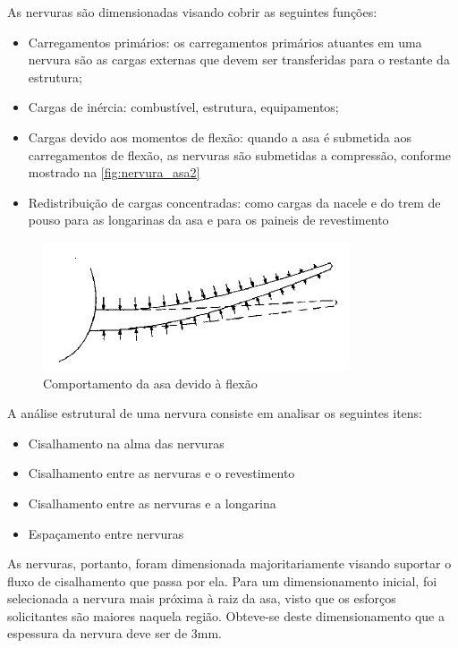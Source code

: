 As nervuras são dimensionadas visando cobrir as seguintes funções:
\begin{itemize}
  \item Carregamentos primários: os carregamentos primários atuantes em uma nervura são as cargas externas que devem ser transferidas para o restante da estrutura;
  \item Cargas de inércia: combustível, estrutura, equipamentos;
  \item Cargas devido aos momentos de flexão: quando a asa é submetida aos carregamentos de flexão, as nervuras são submetidas a compressão, conforme mostrado na \autoref{fig:nervura_asa2}
  \item Redistribuição de cargas concentradas: como cargas da nacele e do trem de pouso para as longarinas da asa e para os paineis de revestimento
\end{itemize}

\begin{figure}
\centering
\includegraphics[width=\textwidth]{images/parte4/nervura2}
\caption{Comportamento da asa devido à flexão}
\label{fig:nervura_asa2}
\end{figure}

A análise estrutural de uma nervura consiste em analisar os seguintes itens:
\begin{itemize}
  \item Cisalhamento na alma das nervuras
  \item Cisalhamento entre as nervuras e o revestimento
  \item Cisalhamento entre as nervuras e a longarina
  \item Espaçamento entre nervuras
\end{itemize}

As nervuras, portanto, foram dimensionada majoritariamente visando suportar o fluxo de cisalhamento que passa por ela. Para um dimensionamento inicial, foi selecionada a nervura mais próxima à raiz da asa, visto que os esforços solicitantes são maiores naquela região. Obteve-se deste dimensionamento que a espessura da nervura deve ser de 3mm.

